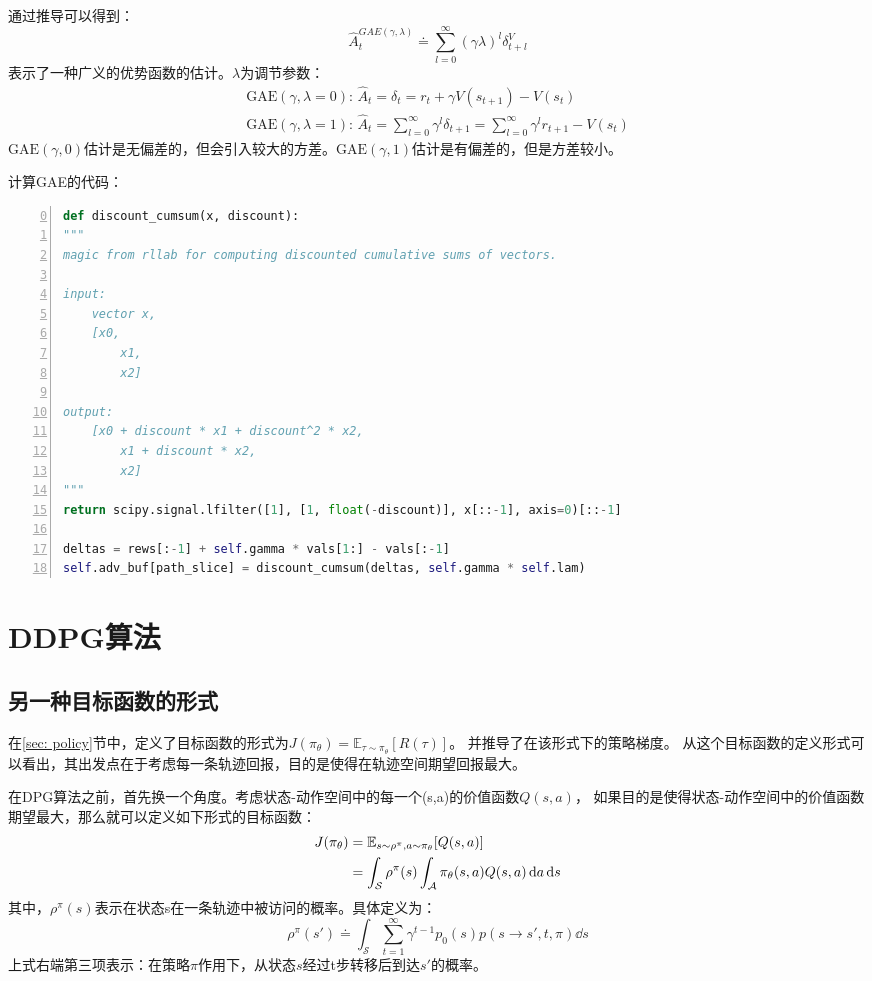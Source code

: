 通过推导可以得到：
\begin{equation*}
    \hat{A}_t^{GAE(\gamma,\lambda)} \doteq \sum_{l=0}^\infty (\gamma \lambda)^l \delta_{t+l}^V
\end{equation*}
表示了一种广义的优势函数的估计。$\lambda$为调节参数：
\begin{gather*}
    \text{GAE}(\gamma,\lambda=0):\, \hat{A}_t = \delta_t = r_t + \gamma V(s_{t+1}) - V(s_t) \\
    \text{GAE}(\gamma,\lambda=1):\, \hat{A}_t = \sum_{l=0}^\infty \gamma^l \delta_{t+1} = \sum_{l=0}^\infty \gamma^l r_{t+1} - V(s_t)
\end{gather*}
$\text{GAE}(\gamma,0)$估计是无偏差的，但会引入较大的方差。$\text{GAE}(\gamma,1)$估计是有偏差的，但是方差较小。

计算GAE的代码：
\begin{lstlisting}[language=python,numbers=left,firstnumber = 0,numberstyle=\tiny,breaklines = true,keywordstyle=\color{blue!70},commentstyle=\color{red!50!green!50!blue!50},frame=shadowbox, rulesepcolor=\color{red!20!green!20!blue!20}]
def discount_cumsum(x, discount):
"""
magic from rllab for computing discounted cumulative sums of vectors.

input: 
    vector x, 
    [x0, 
        x1, 
        x2]

output:
    [x0 + discount * x1 + discount^2 * x2,  
        x1 + discount * x2,
        x2]
"""
return scipy.signal.lfilter([1], [1, float(-discount)], x[::-1], axis=0)[::-1]

deltas = rews[:-1] + self.gamma * vals[1:] - vals[:-1]
self.adv_buf[path_slice] = discount_cumsum(deltas, self.gamma * self.lam)
\end{lstlisting}

\section{DDPG算法}
\subsection{另一种目标函数的形式}
在\ref{sec: policy}节中，定义了目标函数的形式为$ J(\pi_\theta) = \mathbb{E}_{\tau\sim\pi_\theta}[R(\tau)] $。
并推导了在该形式下的策略梯度。
从这个目标函数的定义形式可以看出，其出发点在于考虑每一条轨迹回报，目的是使得在轨迹空间期望回报最大。

在DPG算法之前，首先换一个角度。考虑状态-动作空间中的每一个(s,a)的价值函数$Q(s,a)$，
如果目的是使得状态-动作空间中的价值函数期望最大，那么就可以定义如下形式的目标函数：
\begin{align}{\label{eq: J2}}
    J(\pi_\theta) &= \mathbb{E}_{s\sim\rho^\pi,a\sim\pi_\theta}[Q(s,a)] \notag \\ 
    &= \int_{\mathcal{S}}\rho^\pi(s)\int_{\mathcal{A}}\pi_\theta(s,a)Q(s,a)\mathop{}\!\mathrm{d} a \mathop{}\!\mathrm{d} s
\end{align}
其中，$\rho^\pi(s)$表示在状态s在一条轨迹中被访问的概率。具体定义为：
\begin{equation*}
    \rho^{\pi}(s') \doteq \int_{\mathcal{S}} \sum_{t=1}^{\infty} \gamma^{t-1} p_0(s) p(s \rightarrow s', t, \pi) \dd s
\end{equation*}
上式右端第三项表示：在策略$\pi$作用下，从状态$s$经过t步转移后到达$s'$的概率。

